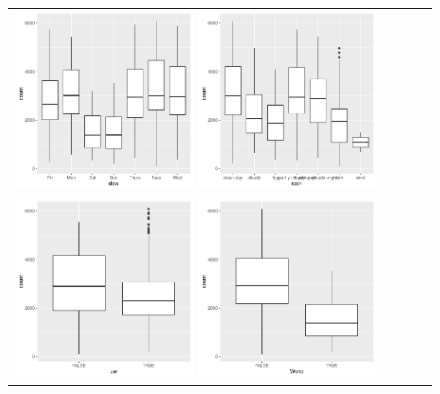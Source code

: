 \documentclass [11pt, proquest] {uwthesis}[2015/03/03]
\begin{document}
\begin{figure}
\vspace{-40pt}
\begin{tabular}{ll}
\includegraphics[width=0.45\textwidth]{figures/dow_cat}
\includegraphics[width=0.45\textwidth]{figures/icon_cat}\\
\includegraphics[width=0.45\textwidth]{figures/uw_cat}
\includegraphics[width=0.45\textwidth]{figures/wknd_cat}\\

\end{tabular}
\end{figure}
\end{document}
